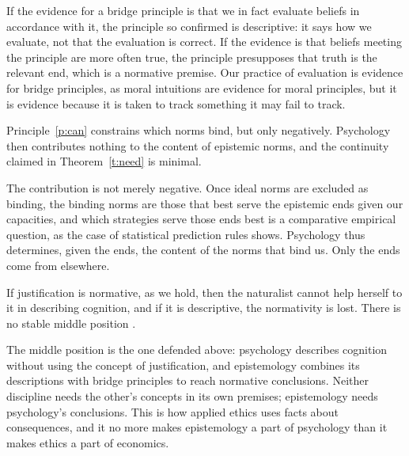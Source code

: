 \documentclass{situationist-preprint}
\begin{document}
\begin{reply}
If the evidence for a bridge principle is that we in fact evaluate beliefs in accordance with it, the principle so confirmed is descriptive: it says how we evaluate, not that the evaluation is correct. If the evidence is that beliefs meeting the principle are more often true, the principle presupposes that truth is the relevant end, which is a normative premise. Our practice of evaluation is evidence for bridge principles, as moral intuitions are evidence for moral principles, but it is evidence because it is taken to track something it may fail to track.
\end{reply}

\begin{objection}\label{o:weak}
Principle~\ref{p:can} constrains which norms bind, but only negatively. Psychology then contributes nothing to the content of epistemic norms, and the continuity claimed in Theorem~\ref{t:need} is minimal.
\end{objection}

\begin{reply}
The contribution is not merely negative. Once ideal norms are excluded as binding, the binding norms are those that best serve the epistemic ends given our capacities, and which strategies serve those ends best is a comparative empirical question, as the case of statistical prediction rules shows. Psychology thus determines, given the ends, the content of the norms that bind us. Only the ends come from elsewhere.
\end{reply}

\begin{objection}\label{o:kim}
If justification is normative, as we hold, then the naturalist cannot help herself to it in describing cognition, and if it is descriptive, the normativity is lost. There is no stable middle position \citep{Kim1988}.
\end{objection}

\begin{reply}
The middle position is the one defended above: psychology describes cognition without using the concept of justification, and epistemology combines its descriptions with bridge principles to reach normative conclusions. Neither discipline needs the other's concepts in its own premises; epistemology needs psychology's conclusions. This is how applied ethics uses facts about consequences, and it no more makes epistemology a part of psychology than it makes ethics a part of economics.
\end{reply}
\end{document}
